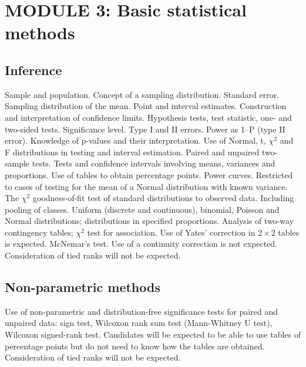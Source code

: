 \section*{MODULE 3: Basic statistical methods}
\subsection*{Inference}
Sample and population. 
Concept of a sampling distribution. 
Standard error.
Sampling distribution of the mean.
Point and interval estimates. 
Construction and interpretation of confidence limits.
Hypothesis tests, test statistic, one- and two-sided tests.
Significance level. 
Type I and II errors. Power as 1–P (type II error).
Knowledge of p-values and their interpretation.
Use of Normal, t, $\chi^2$ and F distributions in testing and interval estimation.
Paired and unpaired two-sample tests.
Tests and confidence intervals involving means, variances and proportions. 
Use of tables to obtain percentage points.
Power curves.
Restricted to cases of testing for the mean of a Normal distribution with known variance.
The $\chi^2$ goodness-of-fit test of standard distributions to observed data.
Including pooling of classes. Uniform (discrete and continuous), binomial, Poisson and Normal distributions; distributions in specified proportions.
Analysis of two-way contingency tables; $\chi^2$ test for association.
Use of Yates' correction in $2 \times 2$ tables is expected.
McNemar’s test.
Use of a continuity correction is not expected. Consideration of tied ranks will not be expected.
\subsection{Non-parametric methods}
Use of non-parametric and distribution-free significance tests for paired and unpaired data: sign test, Wilcoxon rank sum test (Mann-Whitney U test), Wilcoxon signed-rank test.
Candidates will be expected to be able to use tables of percentage points but do not need to know how the tables are obtained.
Consideration of tied ranks will not be expected.


